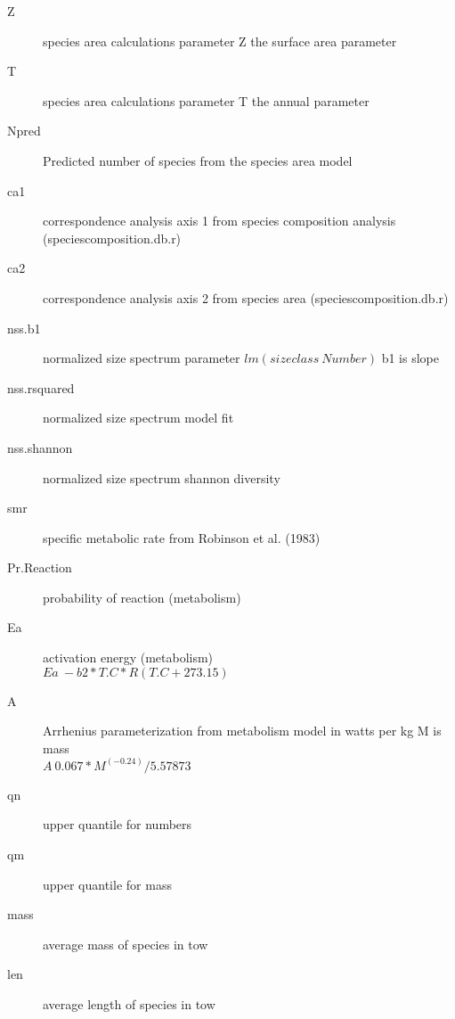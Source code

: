 \documentclass[10pt,letter,twocolumn]{article}
\begin{document}
\begin{description}
	\item[Z] species area calculations parameter Z the surface area parameter
	\item[T] species area calculations parameter T the annual parameter
	\item[Npred] Predicted number of species from the species area model
	\item[ca1] correspondence analysis axis 1 from species composition analysis (speciescomposition.db.r)
	\item[ca2] correspondence analysis axis 2 from species area (speciescomposition.db.r)
	\item[nss.b1] normalized size spectrum parameter $lm(sizeclass~Number)$ b1 is slope
	\item[nss.rsquared] normalized size spectrum model fit
	\item[nss.shannon] normalized size spectrum shannon diversity
	\item[smr] specific metabolic rate from Robinson et al. (1983)
	\item[Pr.Reaction] probability of reaction (metabolism)
	\item[Ea] activation energy (metabolism) \\$Ea ~ -b2 * T.C * R (T.C +273.15)$
	\item[A] Arrhenius parameterization from metabolism model in watts per kg M is mass \\ $A  ~ 0.067 * M^(-0.24) / 5.57873 $
	\item[qn] upper quantile for numbers
	\item[qm] upper quantile for mass
	\item[mass] average mass of species in tow
	\item[len] average length of species in tow
	
	
\end{description}
\end{document}
